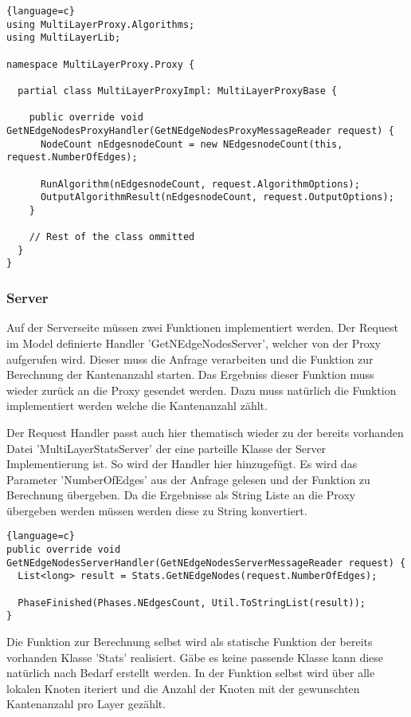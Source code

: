 \begin{lstlisting}{language=c}
using MultiLayerProxy.Algorithms;
using MultiLayerLib;

namespace MultiLayerProxy.Proxy {

  partial class MultiLayerProxyImpl: MultiLayerProxyBase {

    public override void GetNEdgeNodesProxyHandler(GetNEdgeNodesProxyMessageReader request) {
      NodeCount nEdgesnodeCount = new NEdgesnodeCount(this, request.NumberOfEdges);

      RunAlgorithm(nEdgesnodeCount, request.AlgorithmOptions);
      OutputAlgorithmResult(nEdgesnodeCount, request.OutputOptions);
    }
  
    // Rest of the class ommitted
  }
}
\end{lstlisting}



\subsubsection{Server}

Auf der Serverseite müssen zwei Funktionen implementiert werden. Der Request im Model definierte Handler 'GetNEdgeNodesServer', welcher von der Proxy aufgerufen wird. Dieser muss die Anfrage verarbeiten und die Funktion zur Berechnung der Kantenanzahl starten. Das Ergebniss dieser Funktion muss wieder zurück an die Proxy gesendet werden.
Dazu muss natürlich die Funktion implementiert werden welche die Kantenanzahl zählt.

Der Request Handler passt auch hier thematisch wieder zu der bereits vorhanden Datei 'MultiLayerStatsServer' der eine parteille Klasse der Server Implementierung ist. So wird der Handler hier hinzugefügt.
Es wird das Parameter 'NumberOfEdges' aus der Anfrage gelesen und der Funktion zu Berechnung übergeben. Da die Ergebnisse als String Liste an die Proxy übergeben werden müssen werden diese zu String konvertiert.


\begin{lstlisting}{language=c}
public override void GetNEdgeNodesServerHandler(GetNEdgeNodesServerMessageReader request) {
  List<long> result = Stats.GetNEdgeNodes(request.NumberOfEdges);

  PhaseFinished(Phases.NEdgesCount, Util.ToStringList(result));
}
\end{lstlisting}

Die Funktion zur Berechnung selbst wird als statische Funktion der bereits vorhanden Klasse 'Stats' realisiert. Gäbe es keine passende Klasse kann diese natürlich nach Bedarf erstellt werden.
In der Funktion selbst wird über alle lokalen Knoten iteriert und die Anzahl der Knoten mit der gewunschten Kantenanzahl pro Layer gezählt. 

